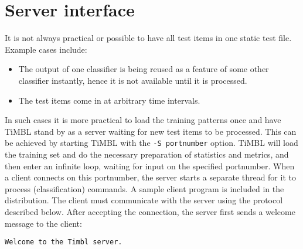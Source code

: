 \documentclass{report}
\begin{document}
\section{Server interface}
\label{serverformat}

It is not always practical or possible to have all test items in one
static test file. Example cases include:

\begin{itemize}
\item The output of one classifier is being reused as a feature of
some other classifier instantly, hence it is not available until it is
processed.
\item The test items come in at arbitrary time intervals.
\end{itemize}

In such cases it is more practical to load the training patterns once
and have TiMBL stand by as a server waiting for new test items to be
processed. This can be achieved by starting TiMBL with the {\tt -S
portnumber} option. TiMBL will load the training set and do the
necessary preparation of statistics and metrics, and then enter an
infinite loop, waiting for input on the specified portnumber. When a
client connects on this portnumber, the server starts a separate
thread for it to process (classification) commands. A sample client
program is included in the distribution. The client must communicate
with the server using the protocol described below. After accepting
the connection, the server first sends a welcome message to the client:

{\tt Welcome to the Timbl server.}
\end{document}
